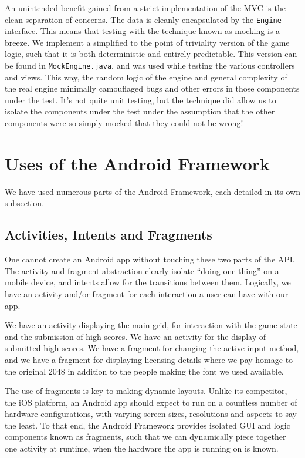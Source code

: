 \documentclass[a4paper, 12pt]{article}
\newcommand{\code}[1]{\texttt{#1}}
\begin{document}
An unintended benefit gained from a strict implementation of the MVC
is the clean separation of concerns. The data is cleanly encapsulated
by the \code{Engine} interface. This means that testing with the
technique known as mocking is a breeze. We implement a simplified to
the point of triviality version of the game logic, such that it is
both deterministic and entirely predictable. This version can be found
in \code{MockEngine.java}, and was used while testing the various
controllers and views. This way, the random logic of the engine and
general complexity of the real engine minimally camouflaged bugs and
other errors in those components under the test. It's not quite unit
testing, but the technique did allow us to isolate the components
under the test under the assumption that the other components were so
simply mocked that they could not be wrong!

\section{Uses of the Android Framework}

We have used numerous parts of the Android Framework, each detailed in
its own subsection.

\subsection{Activities, Intents and Fragments}
One cannot create an Android app without touching these two parts of
the API. The activity and fragment abstraction clearly isolate ``doing
one thing'' on a mobile device, and intents allow for the transitions
between them. Logically, we have an activity and/or fragment for each
interaction a user can have with our app.

We have an activity displaying the main grid, for interaction with the
game state and the submission of high-scores. We have an activity for
the display of submitted high-scores. We have a fragment for changing
the active input method, and we have a fragment for displaying
licensing details where we pay homage to the original 2048 in addition
to the people making the font we used available.

The use of fragments is key to making dynamic layouts. Unlike its
competitor, the iOS platform, an Android app should expect to run on a
countless number of hardware configurations, with varying screen
sizes, resolutions and aspects to say the least. To that end, the
Android Framework provides isolated GUI and logic components known as
fragments, such that we can dynamically piece together one activity at
runtime, when the hardware the app is running on is known.
\end{document}
